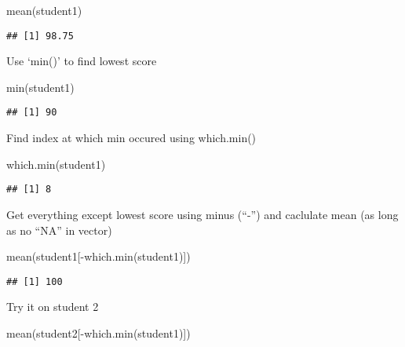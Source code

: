 \documentclass[
]{article}
\newenvironment{Shaded}{\begin{snugshade}}{\end{snugshade}}
\newcommand{\FunctionTok}[1]{\textcolor[rgb]{0.00,0.00,0.00}{#1}}
\newcommand{\NormalTok}[1]{#1}
\newcommand{\SpecialCharTok}[1]{\textcolor[rgb]{0.00,0.00,0.00}{#1}}
\begin{document}
\begin{Shaded}
\begin{Highlighting}[]
\FunctionTok{mean}\NormalTok{(student1)}
\end{Highlighting}
\end{Shaded}

\begin{verbatim}
## [1] 98.75
\end{verbatim}

Use `min()' to find lowest score

\begin{Shaded}
\begin{Highlighting}[]
\FunctionTok{min}\NormalTok{(student1)}
\end{Highlighting}
\end{Shaded}

\begin{verbatim}
## [1] 90
\end{verbatim}

Find index at which min occured using which.min()

\begin{Shaded}
\begin{Highlighting}[]
\FunctionTok{which.min}\NormalTok{(student1)}
\end{Highlighting}
\end{Shaded}

\begin{verbatim}
## [1] 8
\end{verbatim}

Get everything except lowest score using minus (``-'') and caclulate
mean (as long as no ``NA'' in vector)

\begin{Shaded}
\begin{Highlighting}[]
\FunctionTok{mean}\NormalTok{(student1[}\SpecialCharTok{{-}}\FunctionTok{which.min}\NormalTok{(student1)])}
\end{Highlighting}
\end{Shaded}

\begin{verbatim}
## [1] 100
\end{verbatim}

Try it on student 2

\begin{Shaded}
\begin{Highlighting}[]
\FunctionTok{mean}\NormalTok{(student2[}\SpecialCharTok{{-}}\FunctionTok{which.min}\NormalTok{(student1)])}
\end{Highlighting}
\end{Shaded}
\end{document}
